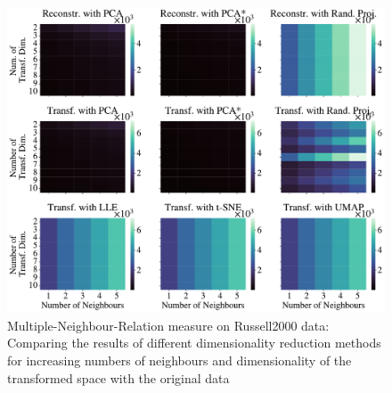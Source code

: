 \documentclass[pdftex,12pt,a4paper]{report}
\begin{document}
\begin{figure}
    \includegraphics[width = \textwidth]{images/real-world/russell2000_stock/dyn_low_dim_vs_num_neigh/multiple_scalar_product/all_methods_1runs_1lines_504points_5neighbours.pdf}
    \caption{Multiple-Neighbour-Relation measure on Russell2000 data: Comparing the results of different dimensionality reduction methods for increasing numbers of neighbours and dimensionality of the transformed space with the original data} \label{fig:num_neigh_vs_dyn_low-mscal-russel}
\end{figure}
\end{document}
